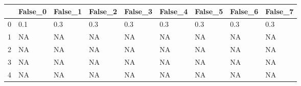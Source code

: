 \begin{tabular}{lllllllll}
\toprule
{} & False\_0 & False\_1 & False\_2 & False\_3 & False\_4 & False\_5 & False\_6 & False\_7 \\ \hline
\midrule
0 &     0.1 &     0.3 &     0.3 &     0.3 &     0.3 &     0.3 &     0.3 &     0.3 \\ \hline
1 &      NA &      NA &      NA &      NA &      NA &      NA &      NA &      NA \\ \hline
2 &      NA &      NA &      NA &      NA &      NA &      NA &      NA &      NA \\ \hline
3 &      NA &      NA &      NA &      NA &      NA &      NA &      NA &      NA \\ \hline
4 &      NA &      NA &      NA &      NA &      NA &      NA &      NA &      NA \\ \hline
\bottomrule
\end{tabular}
